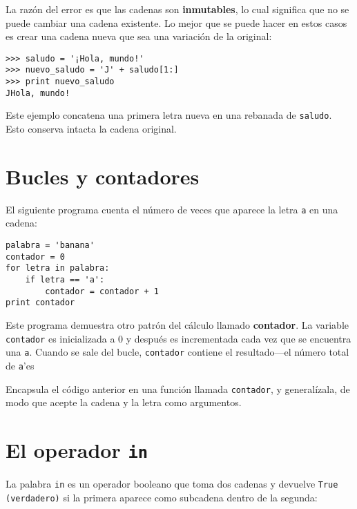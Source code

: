 La razón del error es que las
cadenas son {\bf inmutables}, lo cual significa que no se puede
cambiar una cadena existente. Lo mejor que se puede hacer en estos casos es
crear una cadena nueva que sea una variación de la original:

\beforeverb
\begin{verbatim}
>>> saludo = '¡Hola, mundo!'
>>> nuevo_saludo = 'J' + saludo[1:]
>>> print nuevo_saludo
JHola, mundo!
\end{verbatim}
\afterverb
%
Este ejemplo concatena una primera letra nueva en
una rebanada de {\tt saludo}. Esto conserva intacta
la cadena original.


\section{Bucles y contadores}
\label{counter}


El siguiente programa cuenta el número de veces que aparece la letra
{\tt a} en una cadena:

\beforeverb
\begin{verbatim}
palabra = 'banana'
contador = 0
for letra in palabra:
    if letra == 'a':
        contador = contador + 1
print contador
\end{verbatim}
\afterverb
%
Este programa demuestra otro patrón del cálculo llamado {\bf contador}.
La variable {\tt contador} es inicializada a 0 y después
es incrementada cada vez que se encuentra una {\tt a}.
Cuando se sale del bucle, {\tt contador}
contiene el resultado---el número total de {\tt a}'es

\begin{ex}

Encapsula el código anterior en una función llamada
{\tt contador}, y generalízala, de modo que acepte la cadena y la
letra como argumentos.
\end{ex}

\section{El operador {\tt in}}
\label{inboth}


La palabra {\tt in} es un operador booleano que toma dos cadenas y
devuelve {\tt True (verdadero)} si la primera aparece como subcadena
dentro de la segunda:

